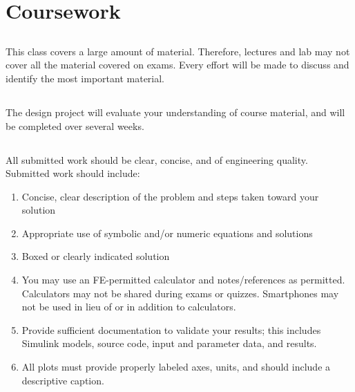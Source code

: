 \documentclass[11pt,courier]{navymemo}
\begin{document}
\section{Coursework}
\subsection{} This class covers a large amount of material. Therefore, lectures and lab may not cover all the material covered on exams. Every effort will be made to discuss and identify the most important material.
\subsection{} The design project will evaluate your understanding of course material, and will be completed over several weeks.
\subsection{} All submitted work should be clear, concise, and of engineering quality. Submitted work should include:
\begin{enumerate}
\item Concise, clear description of the problem and steps taken toward your solution
\item Appropriate use of symbolic and/or numeric equations and solutions
\item Boxed or clearly indicated solution
\item You may use an FE-permitted calculator and notes/references as permitted. Calculators may not be shared during exams or quizzes. Smartphones may not be used in lieu of or in addition to calculators.  
\item Provide sufficient documentation to validate your results; this includes Simulink models, source code, input and parameter data, and results.
\item All plots must provide properly labeled axes, units, and should include a descriptive caption.  
\end{enumerate}

\clearpage
\end{document}
